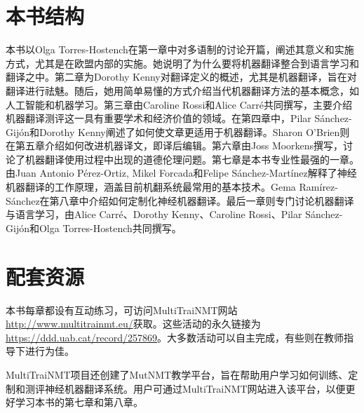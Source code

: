 \documentclass[output=paper]{langscibook}
\begin{document}
\section{本书结构}
本书以Olga Torres-Hostench在第一章中对多语制的讨论开篇，阐述其意义和实施方式，尤其是在欧盟内部的实施。她说明了为什么要将机器翻译整合到语言学习和翻译之中。第二章为Dorothy Kenny对翻译定义的概述，尤其是机器翻译，旨在对翻译进行祛魅。随后，她用简单易懂的方式介绍当代机器翻译方法的基本概念，如人工智能和机器学习。第三章由Caroline Rossi和Alice Carré共同撰写，主要介绍机器翻译测评这一具有重要学术和经济价值的领域。在第四章中，Pilar Sánchez-Gijón和Dorothy Kenny阐述了如何使文章更适用于机器翻译。Sharon O'Brien则在第五章介绍如何改进机器译文，即译后编辑。第六章由Joss Moorkens撰写，讨论了机器翻译使用过程中出现的道德伦理问题。第七章是本书专业性最强的一章。由Juan Antonio Pérez-Ortiz, Mikel Forcada和Felipe Sánchez-Martínez解释了神经机器翻译的工作原理，涵盖目前机翻系统最常用的基本技术。Gema Ramírez-Sánchez在第八章中介绍如何定制化神经机器翻译。最后一章则专门讨论机器翻译与语言学习，由Alice Carré、Dorothy Kenny、Caroline Rossi、Pilar Sánchez-Gijón和Olga Torres-Hostench共同撰写。

\section*{配套资源}
本书每章都设有互动练习，可访问MultiTraiNMT网站\url{http://www.multitrainmt.eu/}获取。这些活动的永久链接为\url{https://ddd.uab.cat/record/257869}。大多数活动可以自主完成，有些则在教师指导下进行为佳。

MultiTraiNMT项目还创建了MutNMT教学平台，旨在帮助用户学习如何训练、定制和测评神经机器翻译系统。用户可通过MultiTraiNMT网站进入该平台，以便更好学习本书的第七章和第八章。

\printbibliography[heading=subbibliography,notkeyword=this]
\end{document}
